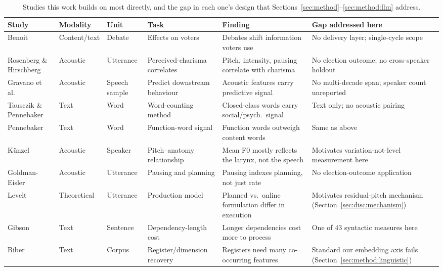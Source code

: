 \documentclass[pdflatex,sn-mathphys-num]{sn-jnl}%
\begin{document}
\begin{table}[t]
\caption{Studies this work builds on most directly, and the gap in each
one's design that Sections~\ref{sec:method}--\ref{sec:method:llm}
address.}
\label{tab:related}
\centering
\footnotesize
\setlength{\tabcolsep}{4pt}
\begin{tabular}{p{}p{}p{}p{}p{}p{}}
\toprule
Study & Modality & Unit & Task & Finding & Gap addressed here \\
\midrule
Benoit \cite{benoit2014debates} & Content/text & Debate & Effects on voters & Debates shift information voters use & No delivery layer; single-cycle scope \\
Rosenberg \& Hirschberg \cite{rosenberg2009acoustic} & Acoustic & Utterance & Perceived-charisma correlates & Pitch, intensity, pausing correlate with charisma & No election outcome; no cross-speaker holdout \\
Gravano et al.\ \cite{hutto2018political} & Acoustic & Speech sample & Predict downstream behaviour & Acoustic features carry predictive signal & No multi-decade span; speaker count unreported \\
Tausczik \& Pennebaker \cite{tausczik2010psychological} & Text & Word & Word-counting method & Closed-class words carry social/psych.\ signal & Text only; no acoustic pairing \\
Pennebaker \cite{pennebaker2014small} & Text & Word & Function-word signal & Function words outweigh content words & Same as above \\
K\"unzel \cite{kunzel1989speakers} & Acoustic & Speaker & Pitch--anatomy relationship & Mean F0 mostly reflects the larynx, not the speech & Motivates variation-not-level measurement here \\
Goldman-Eisler \cite{goldman1968psycholinguistics} & Acoustic & Utterance & Pausing and planning & Pausing indexes planning, not just rate & No election-outcome application \\
Levelt \cite{levelt1989speaking} & Theoretical & Utterance & Production model & Planned vs.\ online formulation differ in execution & Motivates residual-pitch mechanism (Section~\ref{sec:disc:mechanism}) \\
Gibson \cite{gibson1998linguistic} & Text & Sentence & Dependency-length cost & Longer dependencies cost more to process & One of $43$ syntactic measures here \\
Biber \cite{biber1988variation} & Text & Corpus & Register/dimension recovery & Registers need many co-occurring features & Standard our embedding axis fails (Section~\ref{sec:method:linguistic}) \\
\bottomrule
\end{tabular}
\end{table}
\end{document}

